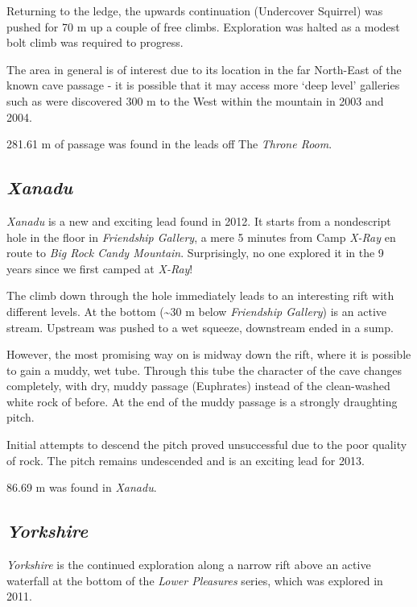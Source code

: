 Returning to the ledge, the upwards continuation (Undercover Squirrel)
was pushed for 70 m up a couple of free climbs. Exploration was halted
as a modest bolt climb was required to progress.

The area in general is of interest due to its location in the far
North-East of the known cave passage - it is possible that it may access
more `deep level' galleries such as were discovered 300 m to the West
within the mountain in 2003 and 2004.

281.61 m of passage was found in the leads off The \emph{Throne Room}.

\hypertarget{xanadu}{%
\subsection{\texorpdfstring{\emph{Xanadu}}{Xanadu}}\label{xanadu}}

\emph{Xanadu} is a new and exciting lead found in 2012. It starts from a
nondescript hole in the floor in \emph{Friendship Gallery}, a mere 5
minutes from Camp \emph{X-Ray} en route to \emph{Big Rock Candy
Mountain}. Surprisingly, no one explored it in the 9 years since we
first camped at \emph{X-Ray}!

The climb down through the hole immediately leads to an interesting rift
with different levels. At the bottom (\textasciitilde 30 m below
\emph{Friendship Gallery}) is an active stream. Upstream was pushed to a
wet squeeze, downstream ended in a sump.

However, the most promising way on is midway down the rift, where it is
possible to gain a muddy, wet tube. Through this tube the character of
the cave changes completely, with dry, muddy passage (Euphrates) instead
of the clean-washed white rock of before. At the end of the muddy
passage is a strongly draughting pitch.

Initial attempts to descend the pitch proved unsuccessful due to the
poor quality of rock. The pitch remains undescended and is an exciting
lead for 2013.

86.69 m was found in \emph{Xanadu}.

\hypertarget{yorkshire}{%
\subsection{\texorpdfstring{\emph{Yorkshire}}{Yorkshire}}\label{yorkshire}}

\emph{Yorkshire} is the continued exploration along a narrow rift above
an active waterfall at the bottom of the \emph{Lower Pleasures} series,
which was explored in 2011.

